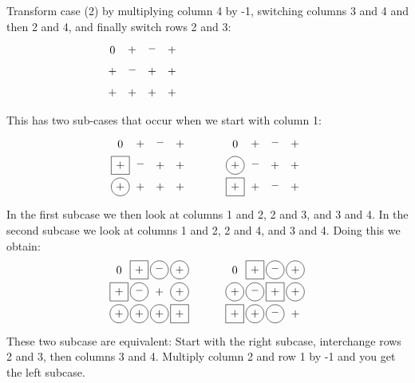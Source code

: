 Transform case (2) by multiplying column 4 by -1, switching columns 3 and 4
and then 2 and 4, and finally switch rows 2 and 3:
\begin{equation*}
\myarrset
\begin{array}{cccc}
\ndcz & \ndcp & \ndcm & \ndcp \\
\ndcp & \ndcm & \ndcp & \ndcp \\
\ndcp & \ndcp & \ndcp & \ndcp 
\end{array}
~~~~~~~~~~~~~~~~~~~~~~~~~~~~~~~~~~~
\end{equation*}
This has two sub-cases that occur when we start with column 1:
\begin{equation*}
\myarrset
\begin{array}{ccccccccc}
\ndcz & \ndcp & \ndcm & \ndcp & ~~~~~~~~~ & \ndcz & \ndcp & \ndcm & \ndcp \\
\dsp  & \ndcm & \ndcp & \ndcp & ~~~~~~~~~ & \dcp  & \ndcm & \ndcp & \ndcp \\
\dcp  & \ndcp & \ndcp & \ndcp & ~~~~~~~~~ & \dsp  & \ndcp & \ndcm & \ndcp
\end{array}
\end{equation*}
In the first subcase we then look at columns 1 and 2, 2 and 3, and 3 and 4.
In the second subcase we look at columns 1 and 2, 2 and 4, and 3 and 4.  Doing
this we obtain:
\begin{equation*}
\myarrset
\begin{array}{ccccccccc}
\ndcz & \dsp  & \dcm  & \dcp  & ~~~~~~~~~ & \ndcz & \dsp  & \dcm  & \dcp  \\
\dsp  & \dcm  & \ndcp & \dcp  & ~~~~~~~~~ & \dcp  & \dcm  & \dsp  & \dcp  \\
\dcp  & \dcp  & \dcp  & \dsp  & ~~~~~~~~~ & \dsp  & \dcp  & \dcm  & \ndcp
\end{array}
\end{equation*}
These two subcase are equivalent:  Start with the right subcase,
interchange rows 2 and 3, then columns 3 and 4.  Multiply column 2 and row 1
by -1 and you get the left subcase.

